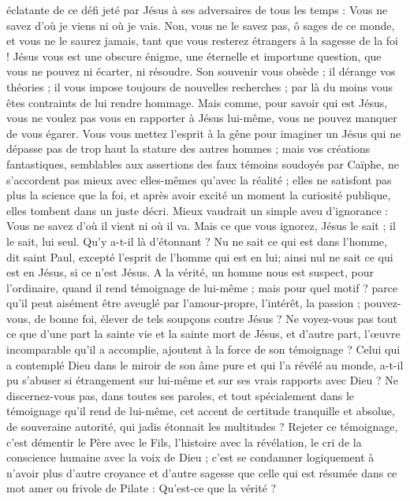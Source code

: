 éclatante de ce défi jeté par Jésus à ses adversaires de tous les temps : \Og{} Vous ne savez d’où je viens ni où je vais.\Fg{} Non, vous ne le savez pas, ô sages de ce monde, et vous ne le saurez jamais, tant que vous resterez étrangers à la sagesse de la foi ! Jésus vous est une obscure énigme, une éternelle et importune question, que vous ne pouvez ni écarter, ni résoudre. Son souvenir vous obsède ; il dérange vos théories ; il vous impose toujours de nouvelles recherches ; par là du moins vous êtes contraints de lui rendre hommage. Mais comme, pour savoir qui est Jésus, vous ne voulez pas vous en rapporter à Jésus lui-même, vous ne pouvez manquer de vous égarer. Vous vous mettez l’esprit à la gêne pour imaginer un Jésus qui ne dépasse pas de trop haut la stature des autres hommes ; mais vos créations fantastiques, semblables aux assertions des faux témoins soudoyés par Caïphe, ne s’accordent pas mieux avec elles-mêmes qu’avec la réalité ; elles ne satisfont pas plus la science que la foi, et après avoir excité un moment la curiosité publique, elles tombent dans un juste décri. Mieux vaudrait un simple aveu d’ignorance : Vous ne savez d’où il vient ni où il va. Mais ce que vous ignorez, Jésus le sait ; il le sait, lui seul. Qu’y a-t-il là d’étonnant ? \Og{} Nu ne sait ce qui est dans l’homme, dit saint Paul, excepté l’esprit de l’homme qui est en lui\Fg{}; ainsi nul ne sait ce qui est en Jésus, si ce n’est Jésus. A la vérité, un homme nous est suspect, pour l’ordinaire, quand il rend témoignage de lui-même ; mais pour quel motif ? parce qu’il peut aisément être aveuglé par l’amour-propre, l’intérêt, la passion ; pouvez-vous, de bonne foi, élever de tels soupçons contre Jésus ? Ne voyez-vous pas tout ce que d’une part la sainte vie et la sainte mort de Jésus, et d’autre part, l’œuvre incomparable qu’il a accomplie, ajoutent à la force de son témoignage ? Celui qui a contemplé Dieu dans le miroir de son âme pure et qui l’a révélé au monde, a-t-il pu s’abuser si étrangement sur lui-même et sur ses vrais rapports avec Dieu ? Ne discernez-vous pas, dans toutes ses paroles, et tout spécialement dans le témoignage qu’il rend de lui-même, cet accent de certitude tranquille et absolue, de souveraine autorité, qui jadis étonnait les multitudes ? Rejeter ce témoignage, c’est démentir le Père avec le Fils, l’histoire avec la révélation, le cri de la conscience humaine avec la voix de Dieu ; c’est se condamner logiquement à n’avoir plus d’autre croyance et d’autre sagesse que celle qui est résumée dans ce mot amer ou frivole de Pilate : \Og{} Qu’est-ce que la vérité ?\Fg{}


